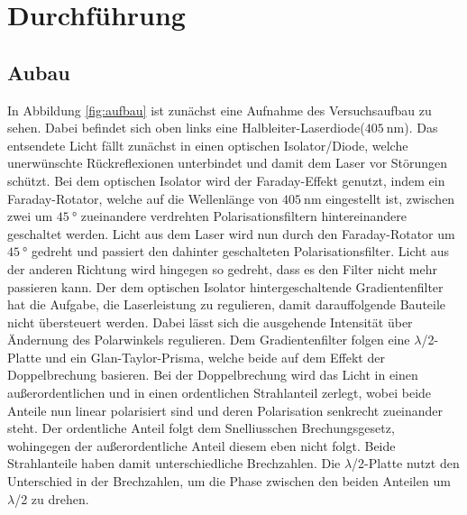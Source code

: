 \section{Durchführung}
\label{sec:Durchführung}

\subsection{Aubau}
\label{sec:Aufbau}

In Abbildung \ref{fig:aufbau} ist zunächst eine Aufnahme des Versuchsaufbau zu
sehen. Dabei befindet sich oben links eine Halbleiter-Laserdiode($\SI{405}{\nano\meter}$).
Das entsendete Licht fällt zunächst in einen optischen Isolator/Diode, welche
unerwünschte Rückreflexionen unterbindet und damit dem Laser vor Störungen schützt.
Bei dem optischen Isolator wird der Faraday-Effekt genutzt, indem ein Faraday-Rotator,
welche auf die Wellenlänge von $\SI{405}{\nano\meter}$ eingestellt ist,
zwischen zwei um $\SI{45}{\degree}$ zueinandere verdrehten Polarisationsfiltern
hintereinandere geschaltet werden. Licht aus dem Laser wird nun durch den Faraday-Rotator
um $\SI{45}{\degree}$ gedreht und passiert den dahinter geschalteten Polarisationsfilter.
Licht aus der anderen Richtung wird hingegen so gedreht, dass es den Filter nicht
mehr passieren kann.
Der dem optischen Isolator hintergeschaltende Gradientenfilter hat die Aufgabe,
die Laserleistung zu regulieren, damit darauffolgende Bauteile nicht übersteuert
werden. Dabei lässt sich die ausgehende Intensität über Ändernung des Polarwinkels
regulieren. Dem Gradientenfilter folgen eine $\lambda$/2-Platte und ein
Glan-Taylor-Prisma, welche beide auf dem Effekt der Doppelbrechung basieren. Bei
der Doppelbrechung wird das Licht in einen außerordentlichen und in einen ordentlichen
Strahlanteil zerlegt, wobei beide Anteile nun linear polarisiert sind und deren
Polarisation senkrecht zueinander steht. Der ordentliche Anteil folgt dem
Snelliusschen Brechungsgesetz, wohingegen der außerordentliche Anteil diesem
eben nicht folgt. Beide Strahlanteile haben damit unterschiedliche Brechzahlen.
Die $\lambda$/2-Platte nutzt den Unterschied in der Brechzahlen, um die Phase
zwischen den beiden Anteilen um $\lambda$/2 zu drehen.

